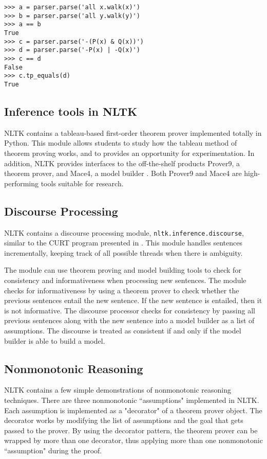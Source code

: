 \documentclass{article}
\newcommand{\dhgcode}[1]{{\tt #1}}
\begin{document}
\begin{verbatim}
>>> a = parser.parse('all x.walk(x)')
>>> b = parser.parse('all y.walk(y)')
>>> a == b
True
>>> c = parser.parse('-(P(x) & Q(x))')
>>> d = parser.parse('-P(x) | -Q(x)')
>>> c == d
False
>>> c.tp_equals(d)
True
\end{verbatim}

\subsection{Inference tools in NLTK}
NLTK contains a tableau-based first-order theorem prover implemented totally in Python.  This module allows students to study how the tableau method of theorem proving works, and to provides an opportunity for experimentation.  In addition, NLTK provides interfaces to the off-the-shelf products Prover9, a theorem prover, and Mace4, a model builder \cite{McCune}.  Both Prover9 and Mace4 are high-performing tools suitable for research.

\subsection{Discourse Processing}
NLTK contains a discourse processing module, \dhgcode{nltk.inference.discourse}, similar to the CURT program presented in \cite{BB}.  This module handles sentences incrementally, keeping track of all possible threads when there is ambiguity.  

The module can use theorem proving and model building tools to check for consistency and informativeness when processing new sentences.  The module checks for informativeness by using a theorem prover to check whether the previous sentences entail the new sentence.  If the new sentence is entailed, then it is not informative.  The discourse processor checks for consistency by passing all previous sentences along with the new sentence into a model builder as a list of assumptions.  The discourse is treated as consistent if and only if the model builder is able to build a model.

\subsection{Nonmonotonic Reasoning}
NLTK contains a few simple demonstrations of nonmonotonic reasoning techniques.  There are three nonmonotonic ``assumptions" implemented in NLTK.  Each assumption is implemented as a "decorator" of a theorem prover object.  The decorator works by modifying the list of assumptions and the goal that gets passed to the prover.  By using the decorator pattern, the theorem prover can be wrapped by more than one decorator, thus applying more than one nonmonotonic ``assumption" during the proof.
\end{document}
